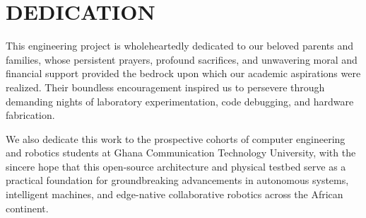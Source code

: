 \chapter*{DEDICATION}

This engineering project is wholeheartedly dedicated to our beloved parents and families, whose persistent prayers, profound sacrifices, and unwavering moral and financial support provided the bedrock upon which our academic aspirations were realized. Their boundless encouragement inspired us to persevere through demanding nights of laboratory experimentation, code debugging, and hardware fabrication. 

We also dedicate this work to the prospective cohorts of computer engineering and robotics students at Ghana Communication Technology University, with the sincere hope that this open-source architecture and physical testbed serve as a practical foundation for groundbreaking advancements in autonomous systems, intelligent machines, and edge-native collaborative robotics across the African continent.
